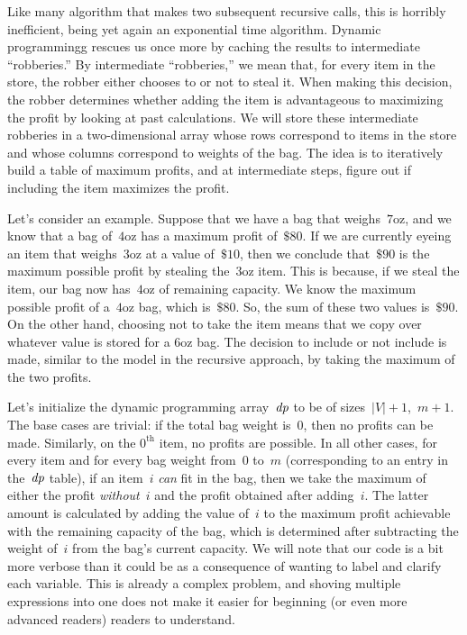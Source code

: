 Like many algorithm that makes two subsequent recursive calls, this is horribly inefficient, being yet again an exponential time algorithm. 
Dynamic programmingg rescues us once more by caching the results to intermediate ``robberies.''
By intermediate ``robberies,'' we mean that, for every item in the store, the robber either chooses to or not to steal it. 
When making this decision, the robber determines whether adding the item is advantageous to maximizing the profit by looking at past calculations.
We will store these intermediate robberies in a two-dimensional array whose rows correspond to items in the store and whose columns correspond to weights of the bag. 
The idea is to iteratively build a table of maximum profits, and at intermediate steps, figure out if including the item maximizes the profit.

Let's consider an example. Suppose that we have a bag that weighs~$7\text{oz}$, and we know that a bag of~$4\text{oz}$ has a maximum profit of~$\$80$. 
If we are currently eyeing an item that weighs~$3\text{oz}$ at a value of~$\$10$, then we conclude that~$\$90$ is the maximum possible profit by stealing the~$3\text{oz}$ item. 
This is because, if we steal the item, our bag now has~$4\text{oz}$ of remaining capacity. 
We know the maximum possible profit of a~$4\text{oz}$ bag, which is~$\$80$. 
So, the sum of these two values is~$\$90$. 
On the other hand, choosing not to take the item means that we copy over whatever value is stored for a $6\text{oz}$ bag. 
The decision to include or not include is made, similar to the model in the recursive approach, by taking the maximum of the two profits.

Let's initialize the dynamic programming array~$\emph{dp}$ to be of sizes~$|V|+1$,~$m+1$. 
The base cases are trivial: if the total bag weight is~$0$, then no profits can be made. 
Similarly, on the $0^\text{th}$ item, no profits are possible.
In all other cases, for every item and for every bag weight from~$0$ to~$m$ (corresponding to an entry in the~$\emph{dp}$ table), if an item~$i$ \emph{can} fit in the bag, then we take the maximum of either the profit \emph{without}~$i$ and the profit obtained after adding~$i$.
The latter amount is calculated by adding the value of~$i$ to the maximum profit achievable with the remaining capacity of the bag, which is determined after subtracting the weight of~$i$ from the bag's current capacity.
We will note that our code is a bit more verbose than it could be as a consequence of wanting to label and clarify each variable.
This is already a complex problem, and shoving multiple expressions into one does not make it easier for beginning (or even more advanced readers) readers to understand.

